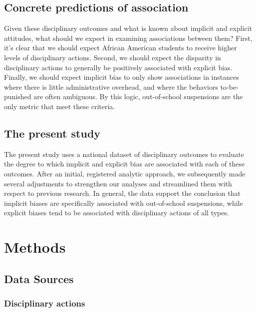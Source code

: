 \documentclass[english,floatsintext,man]{apa6}
\theoremstyle{definition}
\theoremstyle{definition}
\theoremstyle{remark}
\begin{document}
\subsection{Concrete predictions of
association}\label{concrete-predictions-of-association}

Given these disciplinary outcomes and what is known about implicit and
explicit attitudes, what should we expect in examining associations
between them? First, it's clear that we should expect African American
students to receive higher levels of disciplinary actions. Second, we
should expect the disparity in disciplinary actions to generally be
positively associated with explicit bias. Finally, we should expect
implicit bias to only show associations in instances where there is
little administrative overhead, and where the behaviors to-be-punished
are often ambiguous. By this logic, out-of-school suspensions are the
only metric that meet these criteria.

\subsection{The present study}\label{the-present-study}

The present study uses a national dataset of disciplinary outcomes to
evaluate the degree to which implicit and explicit bias are associated
with each of these outcomes. After an initial, registered analytic
approach, we subsequently made several adjustments to strengthen our
analyses and streamlined them with respect to previous research. In
general, the data support the conclusion that implicit biases are
specifically associated with out-of-school suspensions, while explicit
biases tend to be associated with disciplinary actions of all types.

\section{Methods}\label{methods}

\subsection{Data Sources}\label{data-sources}

\subsubsection{Disciplinary actions}\label{disciplinary-actions}
\end{document}
